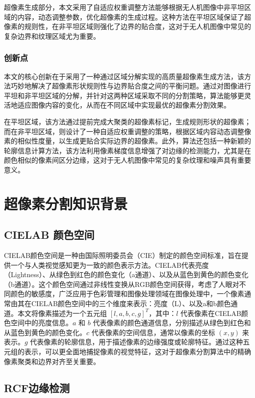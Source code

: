 超像素生成部分，本文采用了自适应权重调整方法能够根据无人机图像中非平坦区域的内容，动态调整参数，优化超像素的生成过程。这种方法在平坦区域保证了超像素的规则性，在非平坦区域则强化了边界的贴合度，这对于无人机图像中常见的复杂边界和纹理区域尤为重要。

\subsubsection{创新点}
本文的核心创新在于采用了一种通过区域分解实现的高质量超像素生成方法，该方法巧妙地解决了超像素形状规则性与边界贴合度之间的平衡问题。通过对图像进行平坦和非平坦区域的分解，并针对这两种区域采取不同的分割策略，算法能够更灵活地适应图像内容的变化，从而在不同区域中实现最优的超像素分割效果。

在平坦区域，该方法通过提前完成大聚类的超像素标记，生成规则形状的超像素；而在非平坦区域，则设计了一种自适应权重调整的策略，根据区域内容动态调整像素的相似性度量，以生成更贴合实际边界的超像素。此外，算法还包括一种新颖的轮廓信息计算方法，该方法利用像素梯度信息增强了对边缘的检测能力，尤其是在颜色相似的像素间区分边缘，这对于无人机图像中常见的复杂纹理和噪声具有重要意义。

\section{超像素分割知识背景}

\subsection{CIELAB 颜色空间}
CIELAB颜色空间是一种由国际照明委员会（CIE）制定的颜色空间标准，旨在提供一个与人类视觉感知更为一致的颜色表示方法。CIELAB代表亮度（Lightness）、从绿色到红色的颜色变化（a通道）、以及从蓝色到黄色的颜色变化（b通道）。这个颜色空间通过非线性变换从RGB颜色空间获得，考虑了人眼对不同颜色的敏感度，广泛应用于色彩管理和图像处理领域在图像处理中，一个像素通常由其在CIELAB颜色空间中的三个维度来表示：亮度（L）、以及a和b颜色通道。本文将像素描述为一个五元组 \([l, a, b, c, g]^T\)，其中：\(l\) 代表像素在CIELAB颜色空间中的亮度信息。\(a\) 和 \(b\) 代表像素的颜色通道信息，分别描述从绿色到红色和从蓝色到黄色的颜色变化。\(c\) 代表像素的空间信息，通常以像素的坐标 \((x, y)\) 来表示。\(g\) 代表像素的轮廓信息，用于描述像素的边缘强度或轮廓特征。通过这种五元组的表示，可以更全面地捕捉像素的视觉特征，这对于超像素分割算法中的精确像素聚类和边界对齐至关重要。\cite{CHTB202304007}

\subsection{RCF边缘检测}

